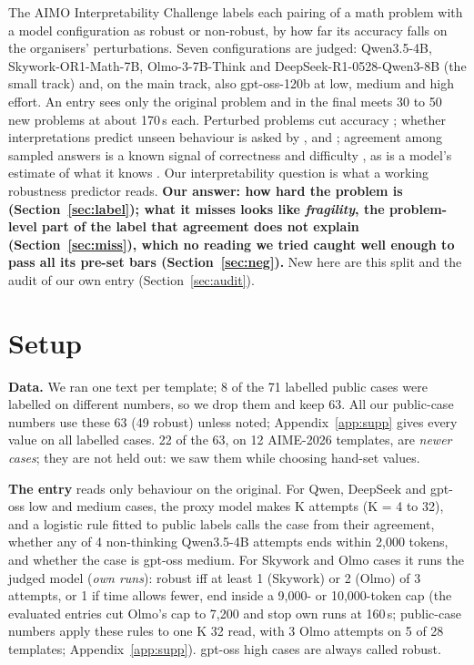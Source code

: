 \documentclass{article}
\begin{document}
The AIMO Interpretability Challenge \citep{stefanik2026} labels each pairing of a math problem with a model
configuration as robust or non-robust, by how far its accuracy falls on the organisers' perturbations. Seven
configurations are judged: Qwen3.5-4B, Skywork-OR1-Math-7B, Olmo-3-7B-Think and DeepSeek-R1-0528-Qwen3-8B (the small
track) and, on the main track, also gpt-oss-120b at low, medium and high effort. An entry sees only the original
problem and in the final meets 30 to 50 new problems at about 170\,s each. Perturbed problems cut accuracy
\citep{mirzadeh2025,huang2025a,mondorf2026}; whether interpretations predict unseen behaviour is asked by
\citet{belinkov2022}, \citet{li2025} and \citet{huang2025b}; agreement among sampled answers is a known signal of
correctness and difficulty \citep{wang2023,kuhn2023,farquhar2024}, as is a model's estimate of what it knows
\citep{kadavath2022}. Our interpretability question is what a working robustness predictor reads. \textbf{Our answer:
how hard the problem is (Section~\ref{sec:label}); what it misses looks like \emph{fragility}, the problem-level part
of the label that agreement does not explain (Section~\ref{sec:miss}), which no reading we tried caught well enough to
pass all its pre-set bars (Section~\ref{sec:neg}).} New here are this split and the audit of our own entry
(Section~\ref{sec:audit}).

\section{Setup}
\label{sec:data}

\textbf{Data.} We ran one text per template; 8 of the 71 labelled public cases were labelled on different numbers, so we
drop them and keep 63. All our public-case numbers use these 63 (49 robust) unless noted; Appendix~\ref{app:supp} gives every value on all labelled cases. 22 of the 63, on 12 AIME-2026 templates, are
\emph{newer cases}; they are not held out: we saw them while choosing hand-set values.

\textbf{The entry} reads only behaviour on the original. For Qwen, DeepSeek and gpt-oss low and medium cases, the
proxy model makes K attempts (K = 4 to 32), and a logistic rule fitted to public labels calls the case from their
agreement, whether any of 4 non-thinking Qwen3.5-4B attempts ends within 2,000 tokens, and whether the case is gpt-oss
medium. For Skywork and Olmo cases it runs the judged model (\emph{own runs}): robust iff at least 1 (Skywork) or 2
(Olmo) of 3 attempts, or 1 if time allows fewer, end inside a 9,000- or 10,000-token cap (the evaluated entries cut
Olmo's cap to 7,200 and stop own runs at 160\,s; public-case numbers apply these rules to one K 32 read, with 3 Olmo
attempts on 5 of 28 templates; Appendix~\ref{app:supp}). gpt-oss high cases are always called robust.
\end{document}
